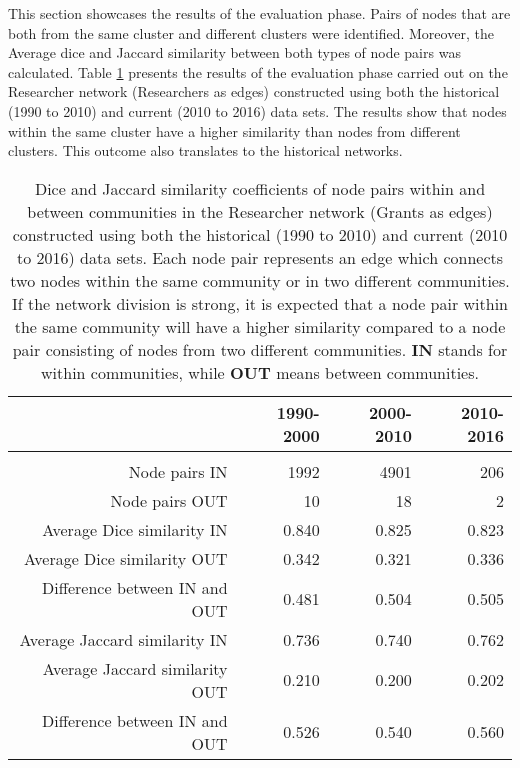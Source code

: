 {This section showcases the results of the evaluation phase. Pairs of nodes that are both from the same cluster and different clusters were identified. Moreover, the Average dice and Jaccard similarity between both types of node pairs was calculated. Table \ref{table:researcher_b_evaluation} presents the results of the evaluation phase carried out on the Researcher network (Researchers as edges) constructed using both the historical (1990 to 2010) and current (2010 to 2016) data sets. The results show that nodes within the same cluster have a higher similarity than nodes from different clusters. This outcome also translates to the historical networks.

\begin{table}[htpb]
\centering
\caption[Dice and Jaccard similarity coefficients of node pairs within and between communities in the Researcher network (Grants as edges) constructed using both the historical (1990 to 2010) and current (2010 to 2016) data sets.]{Dice and Jaccard similarity coefficients of node pairs within and between communities in the Researcher network (Grants as edges) constructed using both the historical (1990 to 2010) and current (2010 to 2016) data sets. Each node pair represents an edge which connects two nodes within the same community or in two different communities. If the network division is strong, it is expected that a node pair within the same community will have a higher similarity compared to a node pair consisting of nodes from two different communities. \textbf{IN} stands for within communities, while \textbf{OUT} means between communities.}
\label{table:researcher_b_evaluation}
\begin{tabular}{r|rrr}
{} & \textbf{1990-2000} & \textbf{2000-2010} & \textbf{2010-2016}\\
\hline\\
Node pairs IN                  & {1992}  & {4901}  & {206}\\
Node pairs OUT                 & {10}    & {18}    & {2}\\
Average Dice similarity IN     & {0.840} & {0.825} & {0.823}\\
Average Dice similarity OUT    & {0.342} & {0.321} & {0.336}\\
Difference between IN and OUT  & {0.481} & {0.504} & {0.505}\\
Average Jaccard similarity IN  & {0.736} & {0.740} & {0.762}\\
Average Jaccard similarity OUT & {0.210} & {0.200} & {0.202}\\
Difference between IN and OUT  & {0.526} & {0.540} & {0.560}\\
\end{tabular}
\end{table}

}
